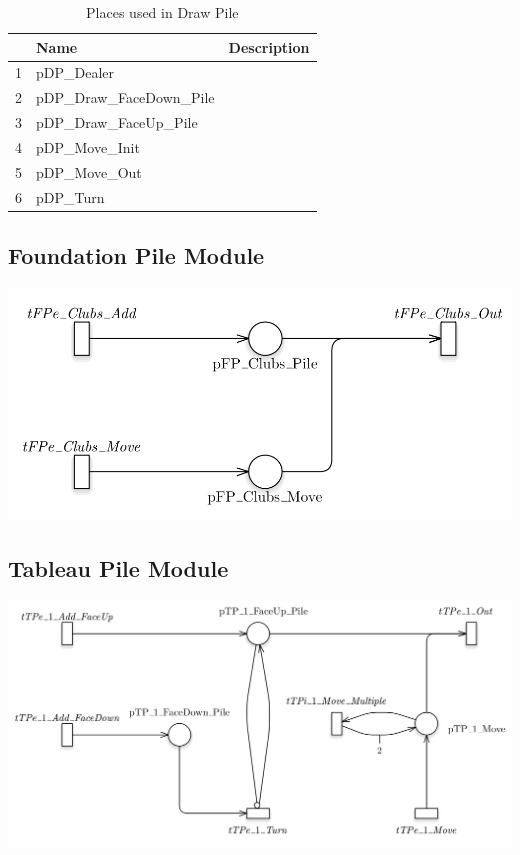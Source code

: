 \documentclass[runningheads,a4paper]{llncs}
\begin{document}
\begin{table}
	\caption{Places used in Draw Pile}
	\begin{tabular}{|l|l|l|}
		\hline
		& Name & Description \\
		\hline
		1  & pDP\_Dealer               &  \\ \hline
		2  & pDP\_Draw\_FaceDown\_Pile &  \\ \hline
		3  & pDP\_Draw\_FaceUp\_Pile   &  \\ \hline
		4  & pDP\_Move\_Init           &  \\ \hline
		5  & pDP\_Move\_Out            &  \\ \hline
		6  & pDP\_Turn                 &  \\ \hline
	\end{tabular}
\end{table}
\subsection{Foundation Pile Module}
\begin{center}
	\includegraphics[width=\textwidth]{images/foundationPile}
\end{center}
\subsection{Tableau Pile Module}
\begin{center}
	\includegraphics[width=\textwidth]{images/tableauPile}
\end{center}
\end{document}
